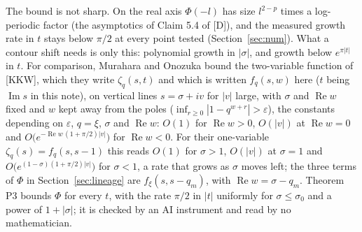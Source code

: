 \documentclass[11pt]{article}
\newcommand{\re}{\operatorname{Re}}
\newcommand{\im}{\operatorname{Im}}
\begin{document}
The bound is not sharp. On the real axis $\Phi(-l)$ has size $l^{2-p}$ times a log-periodic factor (the asymptotics of Claim 5.4 of [D]), and the measured growth rate in $t$ stays below $\pi/2$ at every point tested (Section~\ref{sec:num}). What a contour shift needs is only this: polynomial growth in $|\sigma|$, and growth below $e^{\pi|t|}$ in $t$. For comparison, Murahara and Onozuka \cite[Theorem~1.1 and Corollary~1.2]{MO} bound the two-variable function of [KKW], which they write $\zeta_q(s,t)$ and which is written $f_q(s,w)$ here ($t$ being $\im s$ in this note), on vertical lines $s=\sigma+iv$ for $|v|$ large, with $\sigma$ and $\re w$ fixed and $w$ kept away from the poles ($\inf_{r\ge0}|1-q^{w+r}|>\varepsilon$), the constants depending on $\varepsilon$, $q=\xi$, $\sigma$ and $\re w$: $O(1)$ for $\re w>0$, $O(|v|)$ at $\re w=0$ and $O\bigl(e^{-\re w\,(1+\pi/2)|v|}\bigr)$ for $\re w<0$. For their one-variable $\zeta_q(s)=f_q(s,s-1)$ this reads $O(1)$ for $\sigma>1$, $O(|v|)$ at $\sigma=1$ and $O\bigl(e^{(1-\sigma)(1+\pi/2)|v|}\bigr)$ for $\sigma<1$, a rate that grows as $\sigma$ moves left; the three terms of $\Phi$ in Section~\ref{sec:lineage} are $f_\xi(s,s-q_m)$, with $\re w=\sigma-q_m$. Theorem P3 bounds $\Phi$ for every $t$, with the rate $\pi/2$ in $|t|$ uniformly for $\sigma\le\sigma_0$ and a power of $1+|\sigma|$; it is checked by an AI instrument and read by no mathematician.
\end{document}
